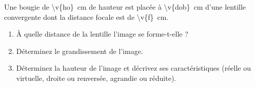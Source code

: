 Une bougie de \qty{\v{ho}}{cm} de hauteur est placée à \qty{\v{dob}}{cm} d'une lentille convergente dont la distance focale est de \qty{\v{f}}{cm}.

\begin{center}
\end{center}

\begin{enumerate}[label=\alph*)]
    \item À quelle distance de la lentille l'image se forme-t-elle ?
    \item Déterminez le grandissement de l'image.
    \item Déterminez la hauteur de l'image et décrivez ses caractéristiques (réelle ou virtuelle, droite ou renversée, agrandie ou réduite).
\end{enumerate}
